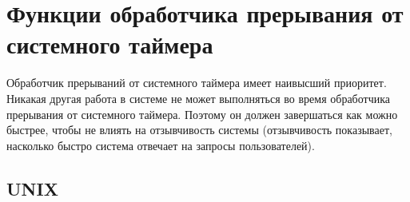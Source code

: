 \chapter{Функции обработчика прерывания от системного таймера}

Обработчик прерываний от системного таймера имеет наивысший приоритет. Никакая другая работа в системе не может выполняться во время обработчика прерывания от системного таймера. Поэтому он должен завершаться как можно быстрее, чтобы не влиять на отзывчивость системы (отзывчивость показывает, насколько
быстро система отвечает на запросы пользователей).

\section{UNIX}

